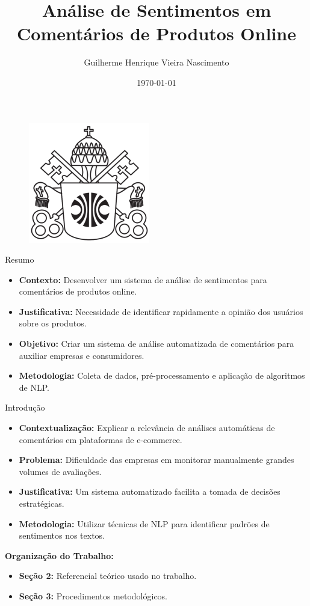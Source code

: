 \documentclass{beamer}
\title{Análise de Sentimentos em Comentários de Produtos Online}
\author{Guilherme Henrique Vieira Nascimento}
\institute{Pontifícia Universidade Católica}
\date{\today}
\begin{document}
\begin{frame}
    \begin{figure}
		\includegraphics[width=0.25\linewidth]{img/logo_puc.png}
	\end{figure}
    \titlepage
\end{frame}

\begin{frame}{Resumo}
    \begin{itemize}
        \item \textbf{Contexto:} Desenvolver um sistema de análise de sentimentos para comentários de produtos online.
        \item \textbf{Justificativa:} Necessidade de identificar rapidamente a opinião dos usuários sobre os produtos.
        \item \textbf{Objetivo:} Criar um sistema de análise automatizada de comentários para auxiliar empresas e consumidores.
        \item \textbf{Metodologia:} Coleta de dados, pré-processamento e aplicação de algoritmos de NLP.
    \end{itemize}
\end{frame}

\begin{frame}{Introdução}
    \begin{itemize}
        \item \textbf{Contextualização:} Explicar a relevância de análises automáticas de comentários em plataformas de e-commerce.
        \item \textbf{Problema:} Dificuldade das empresas em monitorar manualmente grandes volumes de avaliações.
        \item \textbf{Justificativa:} Um sistema automatizado facilita a tomada de decisões estratégicas.
        \item \textbf{Metodologia:} Utilizar técnicas de NLP para identificar padrões de sentimentos nos textos.
    \end{itemize}
    \textbf{Organização do Trabalho:}
    \begin{itemize}
        \item \textbf{Seção 2:} Referencial teórico usado no trabalho.
        \item \textbf{Seção 3:} Procedimentos metodológicos.
    \end{itemize}
\end{frame}
\end{document}
